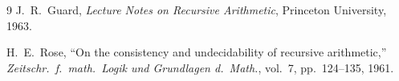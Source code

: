 \documentclass[11pt]{article}
\begin{document}
\begin{thebibliography}{9}
  J.~R.~Guard,
  \emph{Lecture Notes on Recursive Arithmetic},
  Princeton University, 1963.

  H.~E.~Rose,
  ``On the consistency and undecidability of recursive arithmetic,''
  \emph{Zeitschr.\ f.\ math.\ Logik und Grundlagen d.\ Math.},
  vol.~7, pp.~124--135, 1961.
\end{thebibliography}
\end{document}
